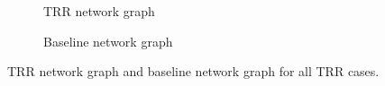 \documentclass[10pt]{article}
\begin{document}
\begin{figure}[H]
\centering
\captionsetup{font=small}
    \begin{subfigure}{0.5\textwidth}
        \caption{TRR network graph}
        \label{trr}
    \end{subfigure}%
    \begin{subfigure}{0.5\textwidth}
        \caption{Baseline network graph}
        \label{baseline}
    \end{subfigure}
\caption{TRR network graph and baseline network graph for all TRR cases.}
\end{figure}
\end{document}
